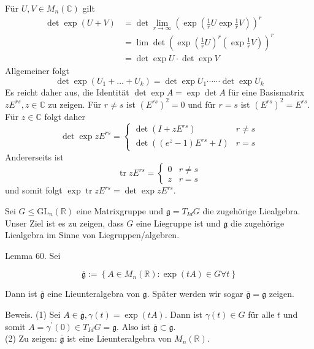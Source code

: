 \documentclass[10pt, letterpaper]{article}
\begin{document}
Für $U, V \in M_{n}(\mathbb{C})$ gilt
$$
\begin{aligned}
\operatorname{det} \exp (U+V) & =\operatorname{det} \lim _{r \rightarrow \infty}\left(\exp \left(\frac{1}{r} U \exp \frac{1}{r} V\right)\right)^{r} \\
& =\lim \operatorname{det}\left(\exp \left(\frac{1}{r} U\right)^{r}\left(\exp \frac{1}{r} V\right)\right)^{r} \\
& =\operatorname{det} \exp U \cdot \operatorname{det} \exp V
\end{aligned}
$$
Allgemeiner folgt
$$
\operatorname{det} \exp \left(U_{1}+\ldots+U_{k}\right)=\operatorname{det} \exp U_{1} \cdots \cdots \operatorname{det} \exp U_{k}
$$
Es reicht daher aus, die Identität $\operatorname{det} \exp A=\exp \operatorname{det} A$ für eine Basismatrix $z E^{r s}, z \in \mathbb{C}$ zu zeigen. Für $r \neq s$ ist $\left(E^{r s}\right)^{2}=0$ und für $r=s$ ist $\left(E^{r s}\right)^{2}=E^{r s}$. Für $z \in \mathbb{C}$ folgt daher
$$
\operatorname{det} \exp z E^{r s}= \begin{cases}\operatorname{det}\left(I+z E^{r s}\right) & r \neq s \\ \operatorname{det}\left(\left(e^{z}-1\right) E^{r s}+I\right) & r=s\end{cases}
$$
Andererseits ist
$$
\operatorname{tr} z E^{r s}= \begin{cases}0 & r \neq s \\ z & r=s\end{cases}
$$
und somit folgt $\exp \operatorname{tr} z E^{r s}=\operatorname{det} \exp z E^{r s}$.

\pagebreak

Sei $G \leq \mathrm{GL}_{n}(\mathbb{R})$ eine Matrixgruppe und $\mathfrak{g}=T_{I d} G$ die zugehörige Liealgebra. Unser Ziel ist es zu zeigen, dass $G$ eine Liegruppe ist und $\mathfrak{g}$ die zugehörige Liealgebra im Sinne von Liegruppen/algebren.

Lemma 60. Sei

$$
\overline{\mathfrak{g}}:=\left\{A \in M_{n}(\mathbb{R}): \exp (t A) \in G \forall t\right\}
$$

Dann ist $\overline{\mathfrak{g}}$ eine Lieunteralgebra von $\mathfrak{g}$. Später werden wir sogar $\overline{\mathfrak{g}}=\mathfrak{g}$ zeigen.

Beweis. (1) Sei $A \in \overline{\mathfrak{g}}, \gamma(t)=\exp (t A)$. Dann ist $\gamma(t) \in G$ für alle $t$ und somit $A=\gamma^{\prime}(0) \in T_{I d} G=\mathfrak{g}$. Also ist $\overline{\mathfrak{g}} \subset \mathfrak{g}$.\\
(2) Zu zeigen: $\overline{\mathfrak{g}}$ ist eine Lieunteralgebra von $M_{n}(\mathbb{R})$.
\end{document}
